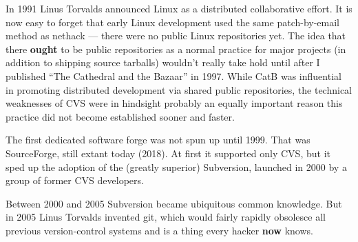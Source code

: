 \documentclass[10pt]{article}
\newcommand{\strong}[1]{\textbf{#1}}
\newcommand{\mc}{\small}
\newcommand{\acro}[1]{{\mc #1\spacefactor1000}}
\begin{document}
In 1991 Linus Torvalds announced Linux as a distributed collaborative effort.
It is now easy to forget that early Linux development used the same
patch-by-email method as nethack --- there were no public Linux repositories yet.
The idea that there \strong{ought} to be public repositories as a normal practice for
major projects (in addition to shipping source tarballs) wouldn't really take
hold until after I published ``The Cathedral and the Bazaar'' in 1997. While CatB
was influential in promoting distributed development via shared public
repositories, the technical weaknesses of \acro{CVS} were in hindsight probably an
equally important reason this practice did not become established sooner and
faster.

The first dedicated software forge was not spun up until 1999. That was
SourceForge, still extant today (2018). At first it supported only \acro{CVS}, but it
sped up the adoption of the (greatly superior) Subversion, launched in 2000 by
a group of former \acro{CVS} developers.

Between 2000 and 2005 Subversion became ubiquitous common knowledge. But in
2005 Linus Torvalds invented git, which would fairly rapidly obsolesce all
previous version-control systems and is a thing every hacker \strong{now} knows.
\end{document}
